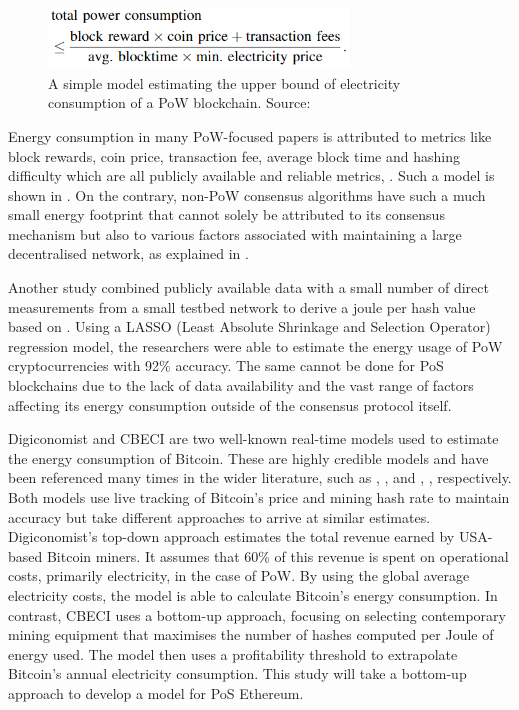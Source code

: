 \begin{figure}[h]
    \centering
    \includegraphics[width=8cm,center]{Figures/SimplePoWModel.png}
    \caption{A simple model estimating the upper bound of electricity consumption of a PoW blockchain. Source: \cite{Sedlmeir2020TheMyth} }
    \label{Figure:SimplePoWModel}
\end{figure}

Energy consumption in many PoW-focused papers is attributed to metrics like block rewards, coin price, transaction fee, average block time and hashing difficulty which are all publicly available and reliable metrics, \cite{Mcdonald2022EthereumEstimate}. Such a model is shown in . On the contrary, non-PoW consensus algorithms have such a much small energy footprint that cannot solely be attributed to its consensus mechanism but also to various factors associated with maintaining a large decentralised network, as explained in . 

Another study combined publicly available data with a small number of direct measurements from a small testbed network to derive a joule per hash value based on \cite{Cole2018ModelingAlgorithms}. Using a LASSO (Least Absolute Shrinkage and Selection Operator) regression model, the researchers were able to estimate the energy usage of PoW cryptocurrencies with 92\% accuracy. The same cannot be done for PoS blockchains due to the lack of data availability and the vast range of factors affecting its energy consumption outside of the consensus protocol itself.

Digiconomist \cite{BitcoinDigiconomist} and CBECI \cite{CambridgeCBECI} are two well-known real-time models used to estimate the energy consumption of Bitcoin. These are highly credible models and have been referenced many times in the wider literature, such as \cite{Cole2018ModelingAlgorithms}, \cite{Lei2021BestRecommendations}, and \cite{Erdogan2022AnalyzingSustainability}, \cite{Platt2022TheProof-of-Work}, respectively. Both models use live tracking of Bitcoin's price and mining hash rate to maintain accuracy but take different approaches to arrive at similar estimates. Digiconomist's top-down approach estimates the total revenue earned by USA-based Bitcoin miners. It assumes that 60\% of this revenue is spent on operational costs, primarily electricity, in the case of PoW. By using the global average electricity costs, the model is able to calculate Bitcoin's energy consumption. In contrast, CBECI uses a bottom-up approach, focusing on selecting contemporary mining equipment that maximises the number of hashes computed per Joule of energy used. The model then uses a profitability threshold to extrapolate Bitcoin's annual electricity consumption. This study will take a bottom-up approach to develop a model for PoS Ethereum.


